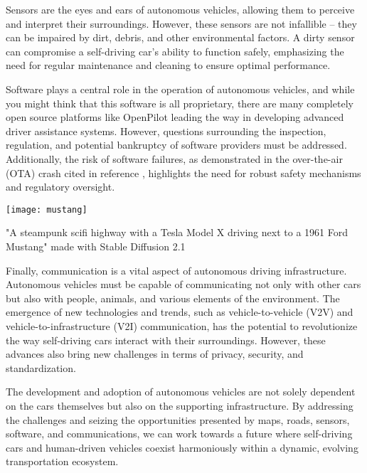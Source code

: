 \begin{pdf}
\begin{pdf}
Sensors are the eyes and ears of autonomous vehicles, allowing them to perceive and interpret their surroundings. However, these sensors are not infallible – they can be impaired by dirt, debris, and other environmental factors. A dirty sensor can compromise a self-driving car's ability to function safely, emphasizing the need for regular maintenance and cleaning to ensure optimal performance.

Software plays a central role in the operation of autonomous vehicles, and while you might think that this software is all proprietary, there are many completely open source platforms like OpenPilot \cite{openpilot} leading the way in developing advanced driver assistance systems. However, questions surrounding the inspection, regulation, and potential bankruptcy of software providers must be addressed. Additionally, the risk of software failures, as demonstrated in the over-the-air (OTA) crash cited in reference \cite{otacrash}, highlights the need for robust safety mechanisms and regulatory oversight.

\begin{pdf}
\begin{marginfigure}[-5.5cm]
        \texttt{[image: mustang]}
        \caption{"A steampunk scifi highway with a Tesla Model X driving next to a 1961 Ford Mustang" made with Stable Diffusion 2.1}
\end{marginfigure}
\end{pdf}

Finally, communication is a vital aspect of autonomous driving infrastructure. Autonomous vehicles must be capable of communicating not only with other cars but also with people, animals, and various elements of the environment. The emergence of new technologies and trends, such as vehicle-to-vehicle (V2V) and vehicle-to-infrastructure (V2I) communication, has the potential to revolutionize the way self-driving cars interact with their surroundings. However, these advances also bring new challenges in terms of privacy, security, and standardization.

The development and adoption of autonomous vehicles are not solely dependent on the cars themselves but also on the supporting infrastructure. By addressing the challenges and seizing the opportunities presented by maps, roads, sensors, software, and communications, we can work towards a future where self-driving cars and human-driven vehicles coexist harmoniously within a dynamic, evolving transportation ecosystem.


\end{pdf}
\end{pdf}
